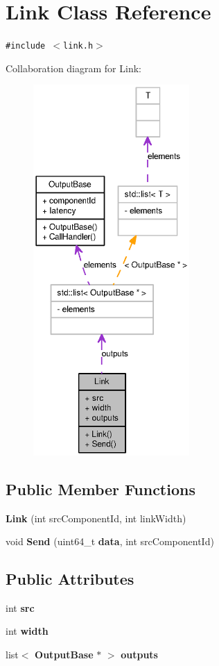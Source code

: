 \section{Link Class Reference}
\label{classLink}
{\tt \#include $<$link.h$>$}

Collaboration diagram for Link:\nopagebreak
\begin{figure}[H]
\begin{center}
\leavevmode
\includegraphics[height=400pt]{classLink__coll__graph}
\end{center}
\end{figure}
\subsection*{Public Member Functions}
\begin{CompactItemize}
\item 
{\bf Link} (int srcComponentId, int linkWidth)
\item 
void {\bf Send} (uint64\_\-t {\bf data}, int srcComponentId)
\end{CompactItemize}
\subsection*{Public Attributes}
\begin{CompactItemize}
\item 
int {\bf src}
\item 
int {\bf width}
\item 
list$<$ {\bf OutputBase} $\ast$ $>$ {\bf outputs}
\end{CompactItemize}


